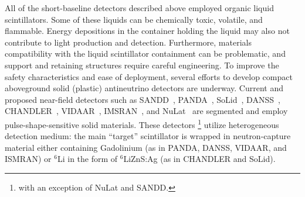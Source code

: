 \documentclass[final,5p,times,twocolumn]{elsarticle}
\begin{document}
All of the short-baseline detectors described above
employed organic liquid scintillators. Some of these liquids can be chemically toxic, volatile, and flammable.
Energy depositions in the container holding the liquid may also not contribute to light production and detection.
Furthermore, materials compatibility with the liquid scintillator containment can be problematic, and support and retaining structures require careful engineering. To improve the safety characteristics and ease of deployment, several efforts to develop compact aboveground solid (plastic) antineutrino detectors are underway. Current and proposed near-field detectors such as SANDD~\cite{SANDD1,sutantoThesis}, PANDA~\cite{Panda2019}, SoLid~\cite{Abreu:2017bpe,Abreu:2018pxg}, DANSS~\cite{Alekseev:2013dmu,Alekseev:2016llm}, CHANDLER~\cite{chandler2019}, VIDAAR~\cite{vidaar}, IMSRAN~\cite{imsran}, and NuLat~\cite{Lane:2015alq,nulat2019,nulatThesis} are segmented and employ pulse-shape-sensitive solid materials.
These detectors \footnote{with an exception of NuLat and SANDD.} utilize heterogeneous detection medium: the main ``target'' scintillator is wrapped in neutron-capture material either containing Gadolinium (as in PANDA, DANSS, VIDAAR, and ISMRAN) or ${^6}$Li in the form of ${^6}$LiZnS:Ag (as in CHANDLER and SoLid).
\end{document}
